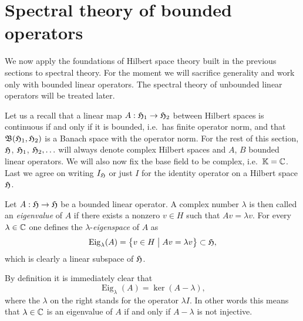 % 
\section{Spectral theory of bounded operators}
\para
We now apply the foundations of Hilbert space theory built in the previous sections to 
spectral theory. For the moment we will sacrifice generality and work only with bounded
linear operators. The spectral theory of unbounded linear operators will be treated later. 

Let us a recall that a linear map $A: \mathfrak{H}_1 \rightarrow \mathfrak{H}_2$ between Hilbert spaces 
is continuous if and only if it is bounded, i.e.\ has finite operator norm, and that 
$\mathfrak{B} (\mathfrak{H}_1,\mathfrak{H}_2)$ is a Banach space with the operator norm. 
For the rest of this section, $\mathfrak{H}$, $\mathfrak{H}_1$, $\mathfrak{H}_2, \ldots$ will always 
denote complex Hilbert spaces and $A$, $B$ bounded linear operators. 
We will also now fix the base field to be complex, i.e.\ $\mathbb{K} = \mathbb{C}$.
Last we agree on writing $I_{\mathfrak{H}}$ or just $I$ for the identity operator on a Hilbert space 
$\mathfrak{H}$. 


\begin{definition}
  Let $A:\mathfrak{H} \to \mathfrak{H}$ be a bounded linear operator.  A complex number $\lambda$
  is then called an \emph{eigenvalue} of $A$ if there exists a nonzero $v \in H$ such that
  $Av = \lambda v$. For every $\lambda \in \mathbb{C}$ one defines the $\lambda$-\emph{eigenspace} of
  $A$ as
  \[
   \operatorname{Eig}_\lambda  (A) = \big\{ v \in H \bigm\vert Av = \lambda v \big\} \subset \mathfrak{H},
  \]
 which is clearly a linear subspace of $\mathfrak{H}$. 
\end{definition}

\para
  By definition it is immediately clear that 
 \[
   \operatorname{Eig}_\lambda (A) = \ker(A - \lambda),
 \]
 where the $\lambda$ on the right stands for the operator $\lambda I$. 
 In other words this means that
 $\lambda\in \mathbb{C}$ is an eigenvalue of $A$ if and only if $A - \lambda$ is not injective.

